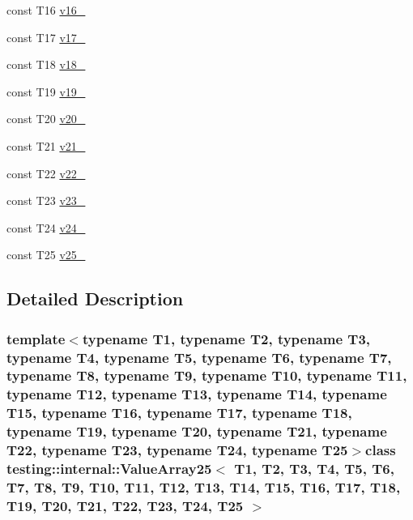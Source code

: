 \begin{DoxyCompactItemize}
\item 
const \-T16 \hyperlink{classtesting_1_1internal_1_1ValueArray25_a8b2b80d31925c1583c3e694d2bf235c5}{v16\-\_\-}
\item 
const \-T17 \hyperlink{classtesting_1_1internal_1_1ValueArray25_a9f59ea9e6f3642f77227dd1f7882d649}{v17\-\_\-}
\item 
const \-T18 \hyperlink{classtesting_1_1internal_1_1ValueArray25_ad07972ee98135c8deb090fc891a04e3e}{v18\-\_\-}
\item 
const \-T19 \hyperlink{classtesting_1_1internal_1_1ValueArray25_a3ad77b5b43c14332dabc9d47c8907e7f}{v19\-\_\-}
\item 
const \-T20 \hyperlink{classtesting_1_1internal_1_1ValueArray25_adb43992f7b5f5f07e0187003b8c9c872}{v20\-\_\-}
\item 
const \-T21 \hyperlink{classtesting_1_1internal_1_1ValueArray25_a80089b2eaa99efb5d3559378fbdac426}{v21\-\_\-}
\item 
const \-T22 \hyperlink{classtesting_1_1internal_1_1ValueArray25_aeec4c711a4f7cf166e6a2646aa7d0bc7}{v22\-\_\-}
\item 
const \-T23 \hyperlink{classtesting_1_1internal_1_1ValueArray25_a7f672a4a694f749a8b6119bff7705a66}{v23\-\_\-}
\item 
const \-T24 \hyperlink{classtesting_1_1internal_1_1ValueArray25_a6c10a180ac97815f7d3f4522507e91ca}{v24\-\_\-}
\item 
const \-T25 \hyperlink{classtesting_1_1internal_1_1ValueArray25_a26cfe8143447970e30441924be04bf08}{v25\-\_\-}
\end{DoxyCompactItemize}


\subsection{\-Detailed \-Description}
\subsubsection*{template$<$typename T1, typename T2, typename T3, typename T4, typename T5, typename T6, typename T7, typename T8, typename T9, typename T10, typename T11, typename T12, typename T13, typename T14, typename T15, typename T16, typename T17, typename T18, typename T19, typename T20, typename T21, typename T22, typename T23, typename T24, typename T25$>$class testing\-::internal\-::\-Value\-Array25$<$ T1, T2, T3, T4, T5, T6, T7, T8, T9, T10, T11, T12, T13, T14, T15, T16, T17, T18, T19, T20, T21, T22, T23, T24, T25 $>$}



